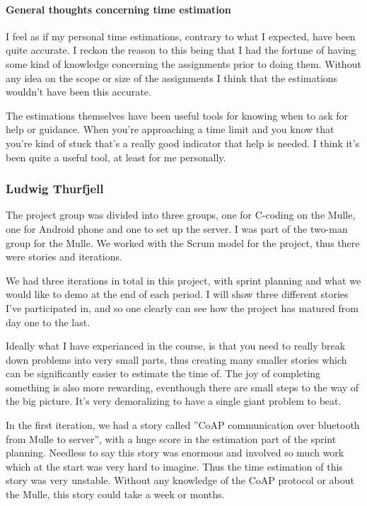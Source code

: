 \paragraph{General thoughts concerning time estimation}

I feel as if my personal time estimations, contrary to what I expected, have been quite accurate. I reckon the reason to this being that I had the fortune of having some kind of knowledge concerning the assignments prior to doing them. Without any idea on the scope or size of the assignments I think that the estimations wouldn't have been this accurate.

The estimations themselves have been useful tools for knowing when to ask for help or guidance. When you're approaching a time limit and you know that you're kind of stuck that's a really good indicator that help is needed. I think it's been quite a useful tool, at least for me personally.

\newpage
\subsubsection{Ludwig Thurfjell}
The project group was divided into three groups, one for C-coding on the Mulle, one for Android phone
and one to set up the server. I was part of the two-man group for the Mulle. We worked with the Scrum model 
for the project, thus there were stories and iterations. 

We had three iterations in total in this project, with sprint planning and what we would like to demo at the 
end of each period. I will show three different stories I've participated in, and so one clearly can see
how the project has matured from day one to the last.

Ideally what I have experianced in the course, is that you need to really break down problems into very small
parts, thus creating many smaller stories which can be significantly easier to estimate the time of. The joy of completing
something is also more rewarding, eventhough there are small steps to the way of the big picture. It's very demoralizing to 
have a single giant problem to beat.

In the first iteration, we had a story called ''CoAP communication over bluetooth from Mulle to server'', with a huge score
in the estimation part of the sprint planning. Needless to say this story was enormous and involved so much work which at the start
was very hard to imagine. Thus the time estimation of this story was very unstable. Without any knowledge of the CoAP protocol or about the Mulle, this story could take a week or months.

